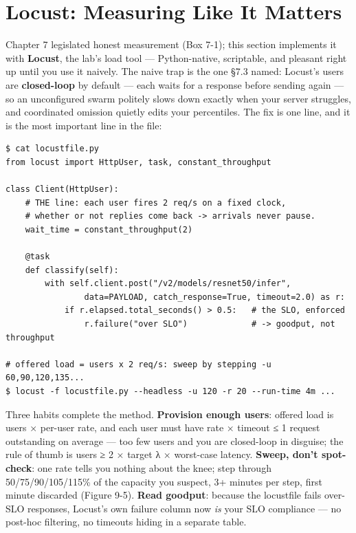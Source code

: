 \section{Locust: Measuring Like It Matters}

Chapter 7 legislated honest measurement (Box 7-1); this section implements it with \textbf{Locust}, the lab's load tool — Python-native, scriptable, and pleasant right up until you use it naively. The naive trap is the one §7.3 named: Locust's users are \textbf{closed-loop} by default — each waits for a response before sending again — so an unconfigured swarm politely slows down exactly when your server struggles, and coordinated omission quietly edits your percentiles. The fix is one line, and it is the most important line in the file:

\begin{terminalbox}
\begin{Verbatim}[breaklines=true,breakanywhere=true,fontsize=\small,formatcom=\color{tbbtermfg},codes=\tbbcodeactive]
$ cat locustfile.py
from locust import HttpUser, task, constant_throughput

class Client(HttpUser):
    # THE line: each user fires 2 req/s on a fixed clock,
    # whether or not replies come back -> arrivals never pause.
    wait_time = constant_throughput(2)

    @task
    def classify(self):
        with self.client.post("/v2/models/resnet50/infer",
                data=PAYLOAD, catch_response=True, timeout=2.0) as r:
            if r.elapsed.total_seconds() > 0.5:   # the SLO, enforced
                r.failure("over SLO")             # -> goodput, not throughput

# offered load = users x 2 req/s: sweep by stepping -u 60,90,120,135...
$ locust -f locustfile.py --headless -u 120 -r 20 --run-time 4m ...
\end{Verbatim}
\end{terminalbox}

Three habits complete the method. \textbf{Provision enough users}: offered load is users × per-user rate, and each user must have rate × timeout ≤ 1 request outstanding on average — too few users and you are closed-loop in disguise; the rule of thumb is users ≥ 2 × target λ × worst-case latency. \textbf{Sweep, don't spot-check}: one rate tells you nothing about the knee; step through 50/75/90/105/115\% of the capacity you suspect, 3+ minutes per step, first minute discarded (Figure 9-5). \textbf{Read goodput}: because the locustfile fails over-SLO responses, Locust's own failure column now \textit{is} your SLO compliance — no post-hoc filtering, no timeouts hiding in a separate table.

